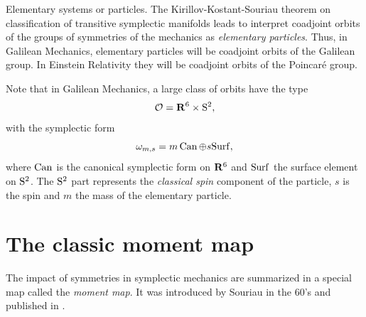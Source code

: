 \begin{Article}{Elementary systems or particles.}
  The Kirillov-Kostant-Souriau%
  \linebreak%
  theorem on classification of transitive symplectic manifolds leads  to interpret coadjoint orbits of the groups of symmetries of the mechanics as \emph{elementary particles}.
  Thus,
  in Galilean Mechanics,
  elementary particles will be coadjoint orbits of the Galilean group.
  In Einstein Relativity they will be coadjoint orbits of the Poincaré group.
  
  Note that in Galilean Mechanics,
  a large class of orbits have the type
  $$%
    \cO  = \RR^6 \times \Sph^2,
    $$%
  with the symplectic form
  $$%
    \omega_{m,s} = m \Can \oplus s \Surf,
    $$%
  where $\operatorname{Can}$ is the canonical symplectic form on $\mathbf{R}^6$ and ${\operatorname{Surf}}$ the surface element on $\mathrm{S}^2$.
  The $\mathrm{S}^2$ part represents the \emph{classical spin} component of the particle,
  $s$ is the spin and $m$ the mass of the elementary particle.
\end{Article}


\section{The classic moment map}

The impact of symmetries in symplectic mechanics are summarized in a special map called the \emph{moment map}.
It was introduced by Souriau in the 60's and published in \cite{Sou70}.


